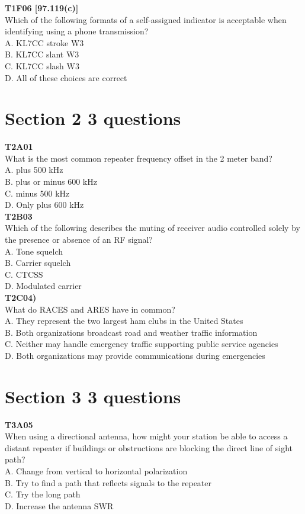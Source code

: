 \documentclass[12pt,letterpaper,twocolumn]{report}
\begin{document}
\textbf{T1F06 [97.119(c)]}\\
Which of the following formats of a self-assigned indicator is acceptable when identifying using a phone transmission?\\
A. KL7CC stroke W3\\
B. KL7CC slant W3\\
C. KL7CC slash W3\\
D. All of these choices are correct\\

\section{Section 2 3 questions}
\textbf{T2A01}\\
What is the most common repeater frequency offset in the 2 meter band?\\
A. plus 500 kHz\\
B. plus or minus 600 kHz\\
C. minus 500 kHz\\
D. Only plus 600 kHz\\

\textbf{T2B03}\\
Which of the following describes the muting of receiver audio controlled solely by the presence or absence of an RF signal?\\
A. Tone squelch\\
B. Carrier squelch\\
C. CTCSS\\
D. Modulated carrier\\

\textbf{T2C04)}\\
What do RACES and ARES have in common?\\
A. They represent the two largest ham clubs in the United States\\
B. Both organizations broadcast road and weather traffic information\\
C. Neither may handle emergency traffic supporting public service agencies\\
D. Both organizations may provide communications during emergencies\\

\section{Section 3 3 questions}

\textbf{T3A05}\\
When using a directional antenna, how might your station be able to access a distant repeater if buildings or obstructions are blocking the direct line of sight path?\\
A. Change from vertical to horizontal polarization\\
B. Try to find a path that reflects signals to the repeater\\
C. Try the long path\\
D. Increase the antenna SWR\\
\end{document}

